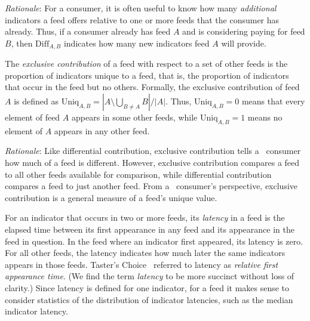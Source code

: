 
\emph{Rationale}: For a consumer, it is often useful to know how many \emph{additional}
indicators a feed offers relative to one or more feeds that the consumer has already.
Thus, if a consumer already has feed $A$ and is considering paying for feed $B$,
then $\mathrm{Diff}_{A,B}$ indicates how many new indicators feed $A$ will provide.

\metrics {} The \emph{exclusive contribution} of
a feed with respect to a set of other feeds is the proportion of indicators
unique to a feed, that is, the proportion of indicators that occur in the feed
but no others. Formally, the exclusive contribution of feed $A$
is defined as $\mathrm{Uniq}_{A,B} = |A \setminus \bigcup_{B\neq A}B|/|A|$.
Thus, $\mathrm{Uniq}_{A,B} = 0$ means that every element of feed $A$ appears in
some other feeds, while $\mathrm{Uniq}_{A,B}=1$ means no element of $A$ appears
in any other feed.


\emph{Rationale}: Like differential contribution, exclusive contribution tells
a \ti\ consumer how much of a feed is different. However, exclusive contribution
compares a feed to all other feeds available for comparison, while differential
contribution compares a feed to just another feed. From a \ti\ consumer's
perspective, exclusive contribution is a general measure of a feed's unique
value.

\metrics {} For an indicator that occurs in two or more feeds, its
\emph{latency} in a feed is the elapsed time between its first appearance in any
feed and its appearance in the feed in question. In the feed where an indicator
first appeared, its latency is zero. For all other feeds, the latency indicates
how much later the same indicators appears in those feeds. Taster's
Choice~\cite{tasters:imc12} referred to latency as \emph{relative first appearance
time}. (We find the term \emph{latency} to be more succinct without loss of
clarity.) Since latency is defined for one indicator, for a feed it makes sense
to consider statistics of the distribution of indicator latencies, such as the
median indicator latency.

